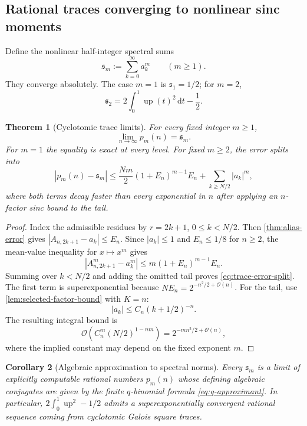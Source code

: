 \documentclass[11pt,oneside]{article}
\newtheorem{theorem}{Theorem}[section]
\newtheorem{corollary}[theorem]{Corollary}
\theoremstyle{definition}
\theoremstyle{remark}
\newcommand{\Up}{\operatorname{up}}
\newcommand{\dd}{\,\mathrm d}
\newcommand{\bigO}{\mathcal O}
\begin{document}
\subsection{Rational traces converging to nonlinear sinc moments}

Define the nonlinear half-integer spectral sums
\begin{equation}\label{eq:spectral-power-sums}
 \mathfrak s_m:=\sum_{k=0}^{\infty}a_k^m
 \qquad(m\ge1).
\end{equation}
They converge absolutely.  The case $m=1$ is $\mathfrak s_1=1/2$; for $m=2$,
\begin{equation}\label{eq:s2-L2}
 \mathfrak s_2=2\int_0^1\Up(t)^2\dd t-\frac12.
\end{equation}

\begin{theorem}[Cyclotomic trace limits]\label{thm:trace-limits}
For every fixed integer $m\ge1$,
\begin{equation}\label{eq:trace-limit}
 \boxed{
 \lim_{n\to\infty}p_m(n)=\mathfrak s_m.}
\end{equation}
For $m=1$ the equality is exact at every level.  For fixed $m\ge2$, the error
splits into
\begin{equation}\label{eq:trace-error-split}
 |p_m(n)-\mathfrak s_m|
 \le \frac{Nm}{2}(1+E_n)^{m-1}E_n
 +\sum_{k\ge N/2}|a_k|^m,
\end{equation}
where both terms decay faster than every exponential in $n$ after applying an
$n$-factor sinc bound to the tail.
\end{theorem}

\begin{proof}
Index the admissible residues by $r=2k+1$, $0\le k<N/2$.  Then
\cref{thm:alias-error} gives
$|A_{n,2k+1}-a_k|\le E_n$.  Since $|a_k|\le1$ and $E_n\le1/8$ for $n\ge2$,
the mean-value inequality for $x\mapsto x^m$ gives
\[
 |A_{n,2k+1}^m-a_k^m|
 \le m(1+E_n)^{m-1}E_n.
\]
Summing over $k<N/2$ and adding the omitted tail proves
\eqref{eq:trace-error-split}.  The first term is superexponential because
$NE_n=2^{-n^2/2+\bigO(n)}$.  For the tail, use
\cref{lem:selected-factor-bound} with $K=n$:
\[
 |a_k|\le C_n(k+1/2)^{-n}.
\]
The resulting integral bound is
\[
 \bigO\!\left(C_n^m(N/2)^{1-nm}\right)
 =2^{-mn^2/2+\bigO(n)},
\]
where the implied constant may depend on the fixed exponent $m$.
\end{proof}

\begin{corollary}[Algebraic approximation to spectral norms]\label{cor:algebraic-spectral-norms}
Every $\mathfrak s_m$ is a limit of explicitly computable rational numbers
$p_m(n)$ whose defining algebraic conjugates are given by the finite
$q$-binomial formula \eqref{eq:q-approximant}.  In particular,
$2\int_0^1\Up^2-1/2$ admits a superexponentially convergent rational sequence
coming from cyclotomic Galois square traces.
\end{corollary}
\end{document}
